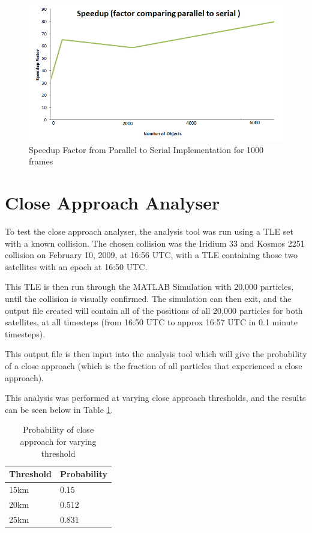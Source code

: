 \documentclass[12pt,openany,a4paper]{book}
\begin{document}
		\begin{figure}[H]
			\centering
			\caption{Speedup Factor from Parallel to Serial Implementation for 1000 frames}
			\label{speedup1000}
			\includegraphics[scale=0.7]{speedup1000.png}
		\end{figure}
		

		
		
		\section{Close Approach Analyser}
		
		To test the close approach analyser, the analysis tool was run using a TLE set with a known collision. The chosen collision was the Iridium 33 and Kosmos 2251 collision on February 10, 2009, at 16:56 UTC, with a TLE containing those two satellites with an epoch at 16:50 UTC. \newline
		
		This TLE is then run through the MATLAB Simulation with 20,000 particles, until the collision is visually confirmed. The simulation can then exit, and the output file created will contain all of the positions of all 20,000 particles for both satellites, at all timesteps (from 16:50 UTC to approx 16:57 UTC in 0.1 minute timesteps). \newline
		
		This output file is then input into the analysis tool which will give the probability of a close approach (which is the fraction of all particles that experienced a close approach). \newline
		
		This analysis was performed at varying close approach thresholds, and the results can be seen below in Table \ref{closeApp}.
		
				\begin{table}[H]
					\caption{Probability of close approach for varying threshold}
					\label{closeApp}
					\centering
					\begin{tabular}{ll}
						\toprule
						Threshold & Probability \\
						\midrule
						15km & $0.15$ \\
						20km & $0.512$  \\
						25km & $0.831$ \\
						\bottomrule
					\end{tabular}
				\end{table}	
				
\end{document}
